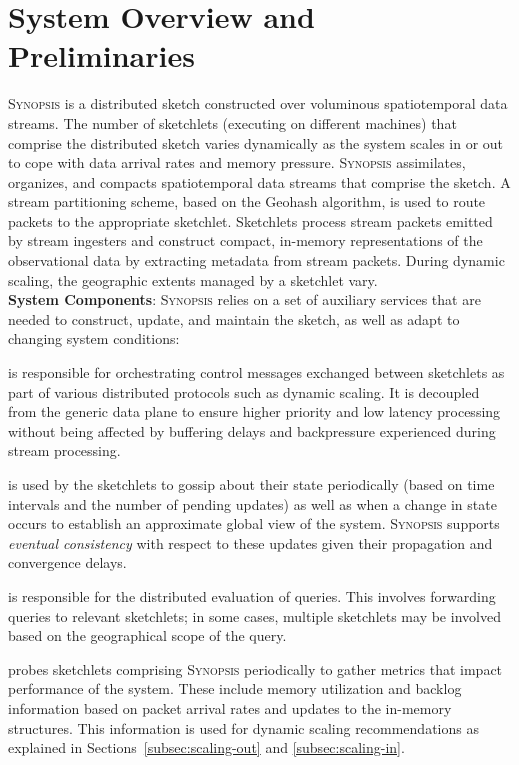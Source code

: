 \section{System Overview and Preliminaries}
\label{sec:system}
\textsc{Synopsis} is a distributed sketch constructed over voluminous spatiotemporal data streams.
The number of sketchlets (executing on different machines) that comprise the distributed sketch varies dynamically as the system scales in or out to cope with data arrival rates and memory pressure.
\textsc{Synopsis} assimilates, organizes, and compacts spatiotemporal data streams that comprise the sketch.
A stream partitioning scheme, based on the Geohash algorithm, is used to route packets to the appropriate sketchlet.
Sketchlets process stream packets emitted by stream ingesters and construct compact, in-memory representations of the observational data by extracting metadata from stream packets.
During dynamic scaling, the geographic extents managed by a sketchlet vary.
%
\vspace{0.7em}\\
%
\textbf{System Components}:
\textsc{Synopsis} relies on a set of auxiliary services that are needed to construct, update, and maintain the sketch, as well as adapt to changing system conditions:
\begin{description}[leftmargin=*]
\item[Control plane] is responsible for orchestrating control messages exchanged between sketchlets as part of various distributed protocols such as dynamic scaling.
    It is decoupled from the generic data plane to ensure higher priority and low latency processing without being affected by buffering delays and backpressure experienced during stream processing.

\item[Gossip subsystem] is used by the sketchlets to gossip about their state periodically (based on time intervals and the number of pending updates) as well as when a change in state occurs to establish an approximate global view of the system. \textsc{Synopsis} supports \emph{eventual consistency} with respect to these updates given their propagation and convergence delays.

\item[Querying subsystem] is responsible for the distributed evaluation of queries.
    This involves forwarding queries to relevant sketchlets; in some cases, multiple sketchlets may be involved based on the geographical scope of the query.

\item[Monitoring subsystem] probes sketchlets comprising \textsc{Synopsis} periodically to gather metrics that impact performance of the system.
    These include memory utilization and backlog information based on packet arrival rates and updates to the in-memory structures.
    This information is used for dynamic scaling recommendations as explained in Sections~\ref{subsec:scaling-out} and \ref{subsec:scaling-in}.
\end{description}
